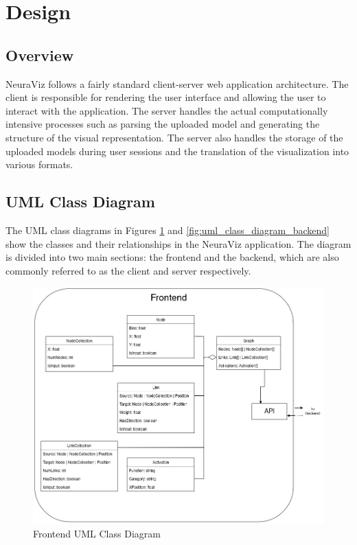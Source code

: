 \section{Design}
\label{sec:Design}

\subsection{Overview} 
NeuraViz follows a fairly standard client-server web application architecture. The client is responsible for rendering the user interface and allowing the user to interact with the application. The server handles the actual computationally intensive processes such as parsing the uploaded model and generating the structure of the visual representation. The server also handles the storage of the uploaded models during user sessions and the translation of the visualization into various formats.

\subsection{UML Class Diagram}
The UML class diagrams in Figures \ref{fig:uml_class_diagram_frontend} and \ref{fig:uml_class_diagram_backend} show the classes and their relationships in the NeuraViz application. The diagram is divided into two main sections: the frontend and the backend, which are also commonly referred to as the client and server respectively. 

\begin{figure}[!htb]
    \centering
    \includegraphics[width=1\textwidth]{../docs/diagrams/class_diagram_frontend.png}
    \caption{Frontend UML Class Diagram}
    \label{fig:uml_class_diagram_frontend}
\end{figure}

